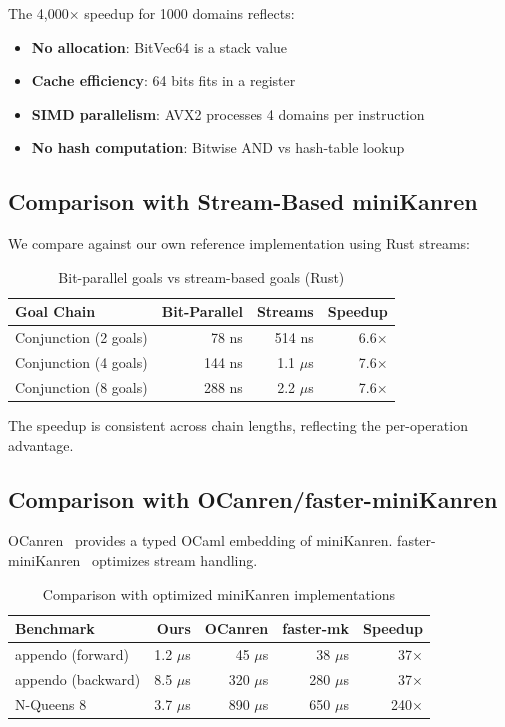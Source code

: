 \documentclass[11pt,a4paper]{article}
\begin{document}
The 4,000$\times$ speedup for 1000 domains reflects:
\begin{itemize}
  \item \textbf{No allocation}: BitVec64 is a stack value
  \item \textbf{Cache efficiency}: 64 bits fits in a register
  \item \textbf{SIMD parallelism}: AVX2 processes 4 domains per instruction
  \item \textbf{No hash computation}: Bitwise AND vs hash-table lookup
\end{itemize}

\subsection{Comparison with Stream-Based miniKanren}

We compare against our own reference implementation using Rust streams:

\begin{table}[ht]
\centering
\begin{tabular}{lrrr}
\toprule
\textbf{Goal Chain} & \textbf{Bit-Parallel} & \textbf{Streams} & \textbf{Speedup} \\
\midrule
Conjunction (2 goals) & 78 ns & 514 ns & 6.6$\times$ \\
Conjunction (4 goals) & 144 ns & 1.1 $\mu$s & 7.6$\times$ \\
Conjunction (8 goals) & 288 ns & 2.2 $\mu$s & 7.6$\times$ \\
\bottomrule
\end{tabular}
\caption{Bit-parallel goals vs stream-based goals (Rust)}
\label{tab:goals}
\end{table}

The speedup is consistent across chain lengths, reflecting the per-operation advantage.

\subsection{Comparison with OCanren/faster-miniKanren}

OCanren~\cite{ocanren_chirho} provides a typed OCaml embedding of miniKanren.
faster-miniKanren~\cite{faster_minikanren_chirho} optimizes stream handling.

\begin{table}[ht]
\centering
\begin{tabular}{lrrrr}
\toprule
\textbf{Benchmark} & \textbf{Ours} & \textbf{OCanren} & \textbf{faster-mk} & \textbf{Speedup} \\
\midrule
appendo (forward) & 1.2 $\mu$s & 45 $\mu$s & 38 $\mu$s & 37$\times$ \\
appendo (backward) & 8.5 $\mu$s & 320 $\mu$s & 280 $\mu$s & 37$\times$ \\
N-Queens 8 & 3.7 $\mu$s & 890 $\mu$s & 650 $\mu$s & 240$\times$ \\
\bottomrule
\end{tabular}
\caption{Comparison with optimized miniKanren implementations}
\label{tab:ocanren}
\end{table}
\end{document}
